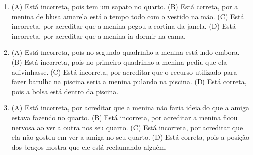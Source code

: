 
\begin{enumerate}
\item
(A) Está incorreta, pois tem um sapato no quarto.
(B) Está correta, por a menina de blusa amarela está o tempo todo com o
vestido na mão.
(C) Está incorreta, por acreditar que a menina pegou a cortina da janela.
(D) Está incorreta, por acreditar que a menina ia dormir na cama.

\item
(A) Está incorreta, pois no segundo quadrinho a menina está indo embora.
(B) Está incorreta, pois no primeiro quadrinho a menina pediu que ela
adivinhasse.
(C) Está incorreta, por acreditar que o recurso utilizado para fazer
barulho na piscina seria a menina pulando na piscina.
(D) Está correta, pois a bolsa está dentro da
piscina.

\item
(A) Está incorreta, por acreditar que a menina não fazia ideia do que a
amiga estava fazendo no quarto.
(B) Está incorreta, por acreditar a menina ficou nervosa ao ver a outra
nos seu quarto.
(C) Está incorreta, por acreditar que ela não gostou em ver a amiga no
seu quarto.
(D) Está correta, pois a posição dos braços mostra que ele está
reclamando alguém.
\end{enumerate}


